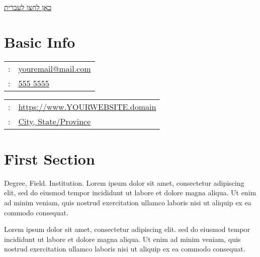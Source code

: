\maketitle
\begin{minipage}[t]{0.25\textwidth}
{\footnotesize\hfill{}\color{gray}
%	
\hfill{}\hyperref[sec:basicinfoheb]{כאן לחצו לעברית} %
}
\end{minipage}
\setLTR
\section{Basic Info}
\label{sec:basicinfoeng}
\begin{minipage}[t]{.5\linewidth}
\begin{tabular}{rp{.75\linewidth}}
\baselineskip=20pt
\email{} :   & \href{mailto:youremail@mail.com}{youremail@mail.com}\\
\phone{} : &\href{tel:5555555}{555 5555} \\
\end{tabular}
\end{minipage}
\begin{minipage}[t]{.5\linewidth}
\begin{tabular}{rl}
\www{} : &\href{https://www.YOURWEBSITE.domain}{https://www.YOURWEBSITE.domain} \\
\location{} : &\href{YOU-MAY-LINK-YOUR-ADDRESS-HERE}{City, State/Province}                  
\end{tabular}
\end{minipage}
%
%
\section{First Section} %
 
{Degree, Field. Institution.}
{Lorem ipsum dolor sit amet, consectetur adipiscing elit, sed do eiusmod tempor incididunt ut labore et dolore magna aliqua. Ut enim ad minim veniam, quis nostrud exercitation ullamco laboris nisi ut aliquip ex ea commodo consequat.}
{}

{Lorem ipsum dolor sit amet, consectetur adipiscing elit.}
{sed do eiusmod tempor incididunt ut labore et dolore magna aliqua.}
{Ut enim ad minim veniam, quis nostrud exercitation ullamco laboris nisi ut aliquip ex ea commodo consequat.}


